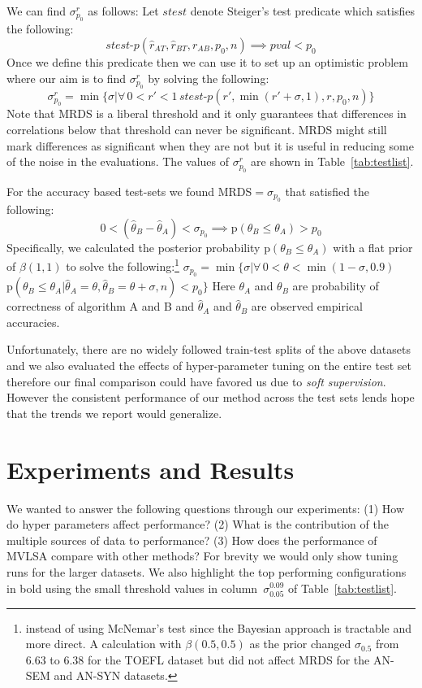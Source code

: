 \documentclass[11pt]{article}
\begin{document}
We can find $\sigma_{p_0}^r$ as follows: Let $\textit{stest}$
denote Steiger's test predicate which satisfies the following:
$$\textit{stest-p}(\hat{r}_{AT}, \hat{r}_{BT}, r_{AB}, p_0, n) {\implies} \textit{pval} < p_0$$
Once we define this predicate then we can use it to set up an optimistic problem where our aim is to find $\sigma_{p_0}^r$ by solving the following:
{\small $$\sigma_{p_0}^r = \min\{\sigma | \forall\, 0 {<} r' {<} 1\, \textit{stest-p}(r',
\min(r'+\sigma, 1), r, p_0, n) \} $$}
Note that MRDS is a liberal threshold and it only guarantees that
differences in correlations below that threshold can never be
significant. MRDS might still mark differences as significant
when they are not but it is useful in reducing some of the noise in
the evaluations.  The values of $\sigma_{p_0}^r$ are shown in
Table~\ref{tab:testlist}.

For the accuracy based test-sets we found MRDS$=\sigma_{p_0}$ that satisfied
the following:
{\small $$ 0< (\hat{\theta}_{B} - \hat{\theta}_{A})<\sigma_{p_0}
  {\implies} \text{p}(\theta_{B} \le \theta_{A}) > p_0$$}
Specifically, we calculated the posterior probability
$\text{p}(\theta_{B} \le \theta_{A})$ with a flat prior of
$\beta(1,1)$ to solve the following:\footnote{instead of using  McNemar's test
  \cite{mcnemar1947note} since the Bayesian approach is tractable and
  more direct. A calculation with $\beta(0.5, 0.5)$ as the prior
  changed $\sigma_{0.5}$ from 6.63 to 6.38 for the TOEFL dataset but
  did not affect MRDS for the AN-SEM and AN-SYN datasets.}
{\small $\sigma_{p_0}=\min\{\sigma |\forall\,
  0{<}\theta{<}\min(1{-}\sigma,0.9)\,$
  $\text{p}(\theta_{B}{\le} \theta_{A}| \hat{\theta}_A{=}\theta,
\hat{\theta}_B{=}\theta+\sigma, n) < p_0\}$}
Here $\theta_{A}$ and $\theta_{B}$ are probability of correctness of
algorithm A and B and $\hat{\theta}_{A}$ and $\hat{\theta}_{B}$ are
observed empirical accuracies.

Unfortunately, there are no widely followed train-test splits of the above
datasets and we also evaluated the effects of hyper-parameter tuning
on the entire test set therefore our final comparison could have
favored us due to \emph{soft supervision}. 
However the consistent performance of our
method across the test sets lends hope that the trends we report would
generalize.


\section{Experiments and Results}
\label{sec:exp}
We wanted to answer the following questions through our experiments:
(1) How do hyper parameters affect performance? (2) What is the
contribution of the multiple sources of data to performance? (3) How
does the performance of MVLSA compare with other methods? For brevity we would only show
tuning runs for the larger datasets. We also highlight
the top performing configurations in bold using the small threshold
values in column~$\sigma_{0.05}^{0.09}$ of Table~\ref{tab:testlist}.
\end{document}
